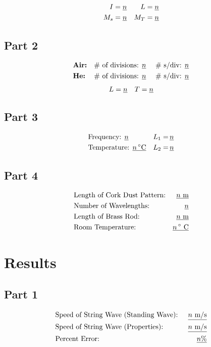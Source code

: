 \documentclass[twocolumn,english]{IEEEtran}
\theoremstyle{plain}
\theoremstyle{plain}
\begin{document}
  \begin{align*}
   I   &= \text{\underline{$n$}}		&L = \text{\underline{$n$}} \\
   M_s &= \text{\underline{$n$}} 		&M_T = \text{\underline{$n$}}
  \end{align*}

  \subsection*{\textbf{Part 2}}
  \begin{align*}
   &\text{\textbf{Air:}}	&\text{\# of divisions: \underline{$n$} }	& &\text{\# s/div: \underline{$n$}} \\
   &\text{\textbf{He:}}		&\text{\# of divisions: \underline{$n$} }	& &\text{\# s/div: \underline{$n$}}
  \end{align*}
  \begin{align*}
   &L = \text{\underline{$n$}}	&T = \text{\underline{$n$}}
  \end{align*}


  \subsection*{\textbf{Part 3}}
  \begin{align*}
   &\text{Frequency: \underline{$n$}} 		&\text{$L_1 =\,$\underline{$n$}} \\
   &\text{Temperature: \underline{$n\,^{\circ}$C}}		&\text{$L_2 =\,$\underline{$n$}}
  \end{align*}

  \subsection*{\textbf{Part 4}}
  \begin{align*}
   &\text{Length of Cork Dust Pattern:} &\text{\underline{$n$ m}} \\
   &\text{Number of Wavelengths:} 	&\text{\underline{$n$}} \\
   &\text{Length of Brass Rod:} 	&\text{\underline{$n$ m}} \\
   &\text{Room Temperature:} 		&\text{\underline{$n\,^{\circ}$ C}}
  \end{align*}

\section{Results}
\subsection*{Part 1}
\begin{align*}
 &\text{Speed of String Wave (Standing Wave): } &\text{\underline{$n$ m/s}} \\
 &\text{Speed of String Wave (Properties): }	&\text{\underline{$n$ m/s}} \\
 &\text{Percent Error: } 			&\text{\underline{$n$\%}}
\end{align*}
\end{document}
